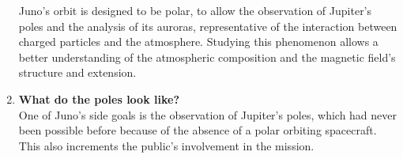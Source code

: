 \begin{enumerate}
    Juno's orbit is designed to be polar, to allow the observation of Jupiter's poles and the analysis of its auroras, representative of the interaction between charged particles and the atmosphere. Studying this phenomenon allows a better understanding of the atmospheric composition and the magnetic field's structure and extension.
    \item \textbf{What do the poles look like?} \cite{video_1h}\\ %
    \label{goal 5}
    One of Juno's side goals is the observation of Jupiter's poles, which had never been possible before because of the absence of a polar orbiting spacecraft. This also increments the public's involvement in the mission.

\end{enumerate}